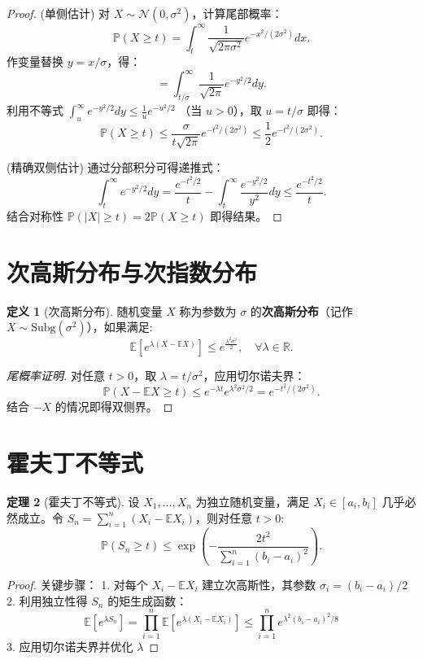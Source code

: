 \documentclass{article}
\theoremstyle{definition}
\newtheorem{theorem}{定理}
\newtheorem{definition}[theorem]{定义}
\renewcommand{\P}{\mathbb{P}}
\newcommand{\E}{\mathbb{E}}
\newcommand{\R}{\mathbb{R}}
\newcommand{\1}{\mathbf{1}}
\newcommand{\subg}{\text{Subg}}
\begin{document}
\begin{proof}
(单侧估计) 对 \( X \sim \mathcal{N}(0, \sigma^2) \)，计算尾部概率：
\[
\P(X \geq t) = \int_t^\infty \frac{1}{\sqrt{2\pi\sigma^2}} e^{-x^2/(2\sigma^2)} dx.
\]
作变量替换 \( y = x/\sigma \)，得：
\[
= \int_{t/\sigma}^\infty \frac{1}{\sqrt{2\pi}} e^{-y^2/2} dy.
\]
利用不等式 \( \int_u^\infty e^{-y^2/2} dy \leq \frac{1}{u} e^{-u^2/2} \) （当 \( u > 0 \)），取 \( u = t/\sigma \) 即得：
\[
\P(X \geq t) \leq \frac{\sigma}{t\sqrt{2\pi}} e^{-t^2/(2\sigma^2)} \leq \frac{1}{2} e^{-t^2/(2\sigma^2)}.
\]

(精确双侧估计) 通过分部积分可得递推式：
\[
\int_t^\infty e^{-y^2/2} dy = \frac{e^{-t^2/2}}{t} - \int_t^\infty \frac{e^{-y^2/2}}{y^2} dy \leq \frac{e^{-t^2/2}}{t}.
\]
结合对称性 \( \P(|X| \geq t) = 2\P(X \geq t) \) 即得结果。
\end{proof}



\section{次高斯分布与次指数分布}

\begin{definition}[次高斯分布]
随机变量 \( X \) 称为参数为 \( \sigma \) 的\textbf{次高斯分布}（记作 \( X \sim \subg(\sigma^2) \)），如果满足:
\[
\E\left[e^{\lambda (X - \E X)}\right] \leq e^{\frac{\lambda^2 \sigma^2}{2}}, \quad \forall \lambda \in \R.
\]
\end{definition}

\begin{proof}[尾概率证明]
对任意 \( t > 0 \)，取 \( \lambda = t/\sigma^2 \)，应用切尔诺夫界：
\[
\P(X - \E X \geq t) \leq e^{-\lambda t} e^{\lambda^2 \sigma^2/2} = e^{-t^2/(2\sigma^2)}.
\]
结合 \( -X \) 的情况即得双侧界。
\end{proof}

\section{霍夫丁不等式}

\begin{theorem}[霍夫丁不等式]
设 \( X_1, \dots, X_n \) 为独立随机变量，满足 \( X_i \in [a_i, b_i] \) 几乎必然成立。令 \( S_n = \sum_{i=1}^n (X_i - \E X_i) \)，则对任意 \( t > 0 \):
\[
\P(S_n \geq t) \leq \exp\left(-\frac{2t^2}{\sum_{i=1}^n (b_i - a_i)^2}\right).
\]
\end{theorem}

\begin{proof}
关键步骤：
1. 对每个 \( X_i - \E X_i \) 建立次高斯性，其参数 \( \sigma_i = (b_i - a_i)/2 \)
2. 利用独立性得 \( S_n \) 的矩生成函数：
\[
\E[e^{\lambda S_n}] = \prod_{i=1}^n \E[e^{\lambda (X_i - \E X_i)}] \leq \prod_{i=1}^n e^{\lambda^2 (b_i - a_i)^2/8}
\]
3. 应用切尔诺夫界并优化 \( \lambda \)
\end{proof}
\end{document}
